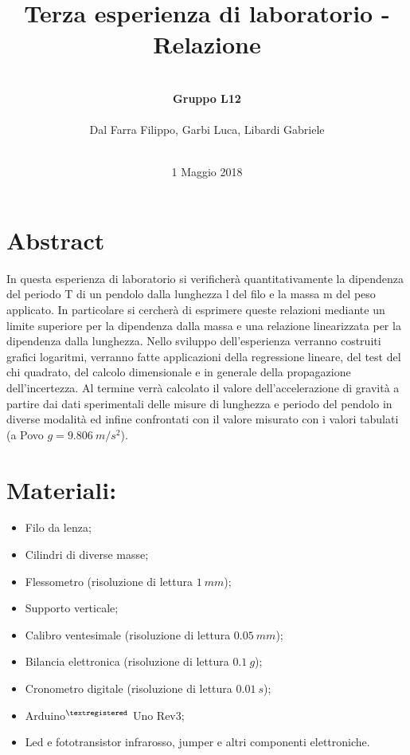 \documentclass[10pt]{article}
\title{Terza esperienza di laboratorio - Relazione}
\author{\\
		\textbf{Gruppo L12}
		\\  
        \\Dal Farra Filippo, Garbi Luca, Libardi Gabriele\\
        \\   
}
\date{{\LARGE 1 Maggio 2018}}
\begin{document}
\maketitle 
\begin{large}

\thispagestyle{empty} %
\newpage 
\tableofcontents
\newpage

\section{Abstract}
In questa esperienza di laboratorio si verificherà quantitativamente la dipendenza del periodo T di un pendolo dalla lunghezza l del filo e la massa m del peso applicato. In particolare si cercherà di esprimere queste relazioni mediante un limite superiore per la dipendenza dalla massa e una relazione linearizzata per la dipendenza dalla lunghezza. Nello sviluppo dell'esperienza verranno costruiti grafici logaritmi, verranno fatte applicazioni della regressione lineare, del test del chi quadrato, del calcolo dimensionale e in generale della propagazione dell'incertezza. Al termine verrà calcolato il valore dell'accelerazione di gravità a partire dai dati sperimentali delle misure di lunghezza e periodo del pendolo in diverse modalità ed infine confrontati con il valore misurato con i valori tabulati (a Povo $g=9.806\ m/s^2$).

\newpage

\section{Materiali:}

  \begin{itemize}
  	\item Filo da lenza;
    \item Cilindri di diverse masse;
    \item Flessometro (risoluzione di lettura $1\ mm$);
    \item Supporto verticale;
    \item Calibro ventesimale (risoluzione di lettura $0.05\ mm$);
    \item Bilancia elettronica (risoluzione di lettura $0.1\ g$);
    \item Cronometro digitale (risoluzione di lettura $0.01\ s$);
    \item Arduino$^{\scriptsize ®}$ Uno Rev3;
    \item Led e fototransistor infrarosso, jumper e altri componenti elettroniche.
  \end{itemize}




\end{large}
\end{document}
